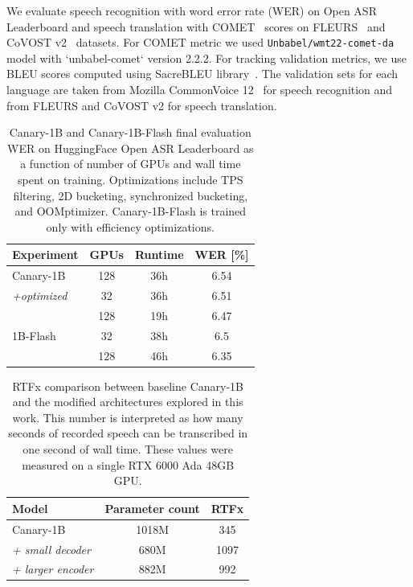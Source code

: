 \documentclass[11pt]{article}
\begin{document}
We evaluate speech recognition with word error rate (WER) on Open ASR Leaderboard and speech translation with COMET~\cite{rei-etal-2020-comet} scores on FLEURS~\cite{fleurs2022arxiv} and CoVOST v2~\cite{wang21s_interspeech} datasets. For COMET metric we used \texttt{Unbabel/wmt22-comet-da} model with `unbabel-comet` version 2.2.2. For tracking validation metrics, we use BLEU scores computed using SacreBLEU library~\cite{post2018call}.
The validation sets for each language are taken from Mozilla CommonVoice 12~\cite{commonvoice:2020} for speech recognition and from FLEURS and CoVOST v2 for speech translation.

\begin{table}[]
    \centering
    \caption{Canary-1B and Canary-1B-Flash final evaluation WER on HuggingFace Open ASR Leaderboard as a function of number of GPUs and wall time spent on training. Optimizations include TPS filtering, 2D bucketing, synchronized bucketing, and OOMptimizer. Canary-1B-Flash is trained only with efficiency optimizations.}
    \begin{tabular}{|l|c|c|c|}
        \hline
        Experiment & GPUs & Runtime & WER [\%] \\
        \hline
        Canary-1B & 128 & 36h & 6.54 \\
        \quad\textit{+optimized} & 32 & 36h & 6.51 \\
         & 128 & 19h & 6.47 \\
        \hline
        1B-Flash & 32 & 38h & 6.5 \\
         & 128 & 46h & 6.35 \\
        \hline
    \end{tabular}
    \label{tab:testresults}
\end{table}

\begin{table}[]
    \centering
    \caption{RTFx comparison between baseline Canary-1B and the modified architectures explored in this work. This number is interpreted as how many seconds of recorded speech can be transcribed in one second of wall time. These values were measured on a single RTX 6000 Ada 48GB GPU.}
    \begin{tabular}{|l|c|c|}
        \hline
        Model & Parameter count & RTFx \\
        \hline
        Canary-1B & 1018M & 345 \\
        \textit{+ small decoder} & 680M & 1097 \\
        \textit{+ larger encoder} & 882M & 992 \\
        \hline
    \end{tabular}
    \label{tab:rtfx}
\end{table}
\end{document}

